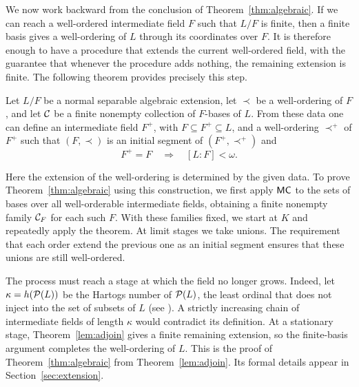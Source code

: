 We now work backward from the conclusion of
Theorem~\ref{thm:algebraic}. If we can reach a well-ordered
intermediate field $F$ such that $L/F$ is finite, then a finite basis
gives a well-ordering of $L$ through its coordinates over $F$.
It is therefore enough to have a procedure that extends the current
well-ordered field, with the guarantee that whenever the procedure
adds nothing, the remaining extension is finite. The following theorem
provides precisely this step.

\begin{samepage}
\begin{overviewtheorem}\label{lem:adjoin}
Let $L/F$ be a normal separable algebraic extension, let $\prec$ be a
well-ordering of $F$, and let $\mathcal C$ be a finite nonempty collection
of $F$-bases of $L$. From these data one can define an intermediate
field $F^+$, with $F\subseteq F^+\subseteq L$, and a well-ordering
$\prec^+$ of $F^+$ such that $(F,\prec)$ is an initial segment of
$(F^+,\prec^+)$ and
\[
 F^+=F\quad\Longrightarrow\quad [L:F]<\omega.
\]
\end{overviewtheorem}
\end{samepage}

Here the extension of the well-ordering is determined by the given
data. To prove Theorem~\ref{thm:algebraic} using this construction, we first apply
$\mathsf{MC}$ to the sets of bases over all well-orderable intermediate
fields, obtaining a finite nonempty family $\mathcal C_F$ for each such
$F$. With these families fixed, we start at $K$ and repeatedly apply
the theorem. At limit stages we take unions. The requirement that each
order extend the previous one as an initial segment ensures that
these unions are still well-ordered.

The process must reach a stage at which the field no longer grows.
Indeed, let $\kappa=h(\mathcal P(L))$ be the Hartogs number of $\mathcal P(L)$,
the least ordinal that does not inject into the set of subsets of
$L$ (see \cite[Lemma~3.4, p.~29]{Jech2003}). A strictly increasing chain of intermediate fields of length
$\kappa$ would contradict its definition. At a stationary stage,
Theorem~\ref{lem:adjoin} gives a finite remaining extension, so the
finite-basis argument completes the well-ordering of $L$. This is
the proof of Theorem~\ref{thm:algebraic} from
Theorem~\ref{lem:adjoin}. Its formal details appear in
Section~\ref{sec:extension}.

